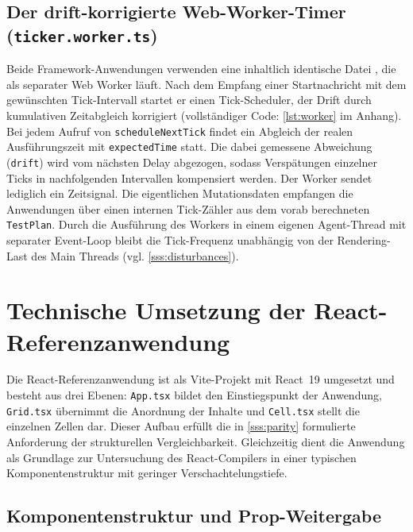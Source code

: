 \subsection{Der drift-korrigierte Web-Worker-Timer (\texttt{ticker.worker.ts})}
\label{ss:impl-worker}

Beide Framework-Anwendungen verwenden eine inhaltlich identische Datei , die als separater Web Worker läuft. Nach dem Empfang einer Startnachricht mit dem gewünschten Tick-Intervall startet er einen Tick-Scheduler, der Drift durch kumulativen Zeitabgleich korrigiert \cite{mills-rfc5905-2010} (vollständiger Code: \cref{lst:worker} im Anhang). Bei jedem Aufruf von \texttt{scheduleNextTick} findet ein Abgleich der realen Ausführungszeit mit \texttt{expectedTime} statt. Die dabei gemessene Abweichung (\texttt{drift}) wird vom nächsten Delay abgezogen, sodass Verspätungen einzelner Ticks in nachfolgenden Intervallen kompensiert werden. Der Worker sendet lediglich ein Zeitsignal. Die eigentlichen Mutationsdaten empfangen die Anwendungen über einen internen Tick-Zähler aus dem vorab berechneten \texttt{TestPlan}. Durch die Ausführung des Workers in einem eigenen Agent-Thread mit separater Event-Loop bleibt die Tick-Frequenz unabhängig von der Rendering-Last des Main Threads \cite{whatwg-html-2026} (vgl. \cref{sss:disturbances}).

\section{Technische Umsetzung der React-Referenzanwendung}
\label{s:impl-react}

Die React-Referenzanwendung ist als Vite-Projekt mit React~19 umgesetzt und besteht aus drei Ebenen: \texttt{App.tsx} bildet den Einstiegspunkt der Anwendung, \texttt{Grid.tsx} übernimmt die Anordnung der Inhalte und \texttt{Cell.tsx} stellt die einzelnen Zellen dar. Dieser Aufbau erfüllt die in \cref{sss:parity} formulierte Anforderung der strukturellen Vergleichbarkeit. Gleichzeitig dient die Anwendung als Grundlage zur Untersuchung des React-Compilers in einer typischen Komponentenstruktur mit geringer Verschachtelungstiefe.

\subsection{Komponentenstruktur und Prop-Weitergabe}
\label{ss:impl-react-components}


